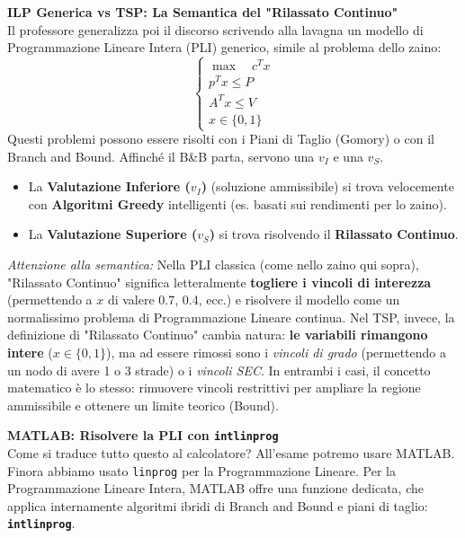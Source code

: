 \documentclass[12pt, a4paper]{article}
\newcommand{\separatore}{\noindent{\color{titlecolor!50}\rule{\textwidth}{0.6pt}}}
\begin{document}
	\textbf{ILP Generica vs TSP: La Semantica del "Rilassato Continuo"}\\
	Il professore generalizza poi il discorso scrivendo alla lavagna un modello di Programmazione Lineare Intera (PLI) generico, simile al problema dello zaino:
	\[
	\begin{cases}
		\max \quad c^T x \\[6pt]
		p^T x \leq P \\
		A^T x \leq V \\
		x \in \{0, 1\}
	\end{cases}
	\]
	Questi problemi possono essere risolti con i Piani di Taglio (Gomory) o con il Branch and Bound. Affinché il B\&B parta, servono una $v_I$ e una $v_S$.
	\begin{itemize}[label=\textcolor{titlecolor}{\Large\textbullet}, itemsep=2pt, leftmargin=1.5cm]
		\item La \textbf{Valutazione Inferiore ($v_I$)} (soluzione ammissibile) si trova velocemente con \textbf{Algoritmi Greedy} intelligenti (es. basati sui rendimenti per lo zaino).
		\item La \textbf{Valutazione Superiore ($v_S$)} si trova risolvendo il \textbf{Rilassato Continuo}.
	\end{itemize}
	\textit{Attenzione alla semantica:}
	Nella PLI classica (come nello zaino qui sopra), "Rilassato Continuo" significa letteralmente \textbf{togliere i vincoli di interezza} (permettendo a $x$ di valere 0.7, 0.4, ecc.) e risolvere il modello come un normalissimo problema di Programmazione Lineare continua.
	Nel TSP, invece, la definizione di "Rilassato Continuo" cambia natura: \textbf{le variabili rimangono intere} ($x \in \{0,1\}$), ma ad essere rimossi sono i \textit{vincoli di grado} (permettendo a un nodo di avere 1 o 3 strade) o i \textit{vincoli SEC}. In entrambi i casi, il concetto matematico è lo stesso: rimuovere vincoli restrittivi per ampliare la regione ammissibile e ottenere un limite teorico (Bound).
	
	\vspace{0.6cm}
	\separatore
	\vspace{0.4cm}
	
	\textbf{MATLAB: Risolvere la PLI con \texttt{intlinprog}}\\
	Come si traduce tutto questo al calcolatore? All'esame potremo usare MATLAB.
	Finora abbiamo usato \texttt{linprog} per la Programmazione Lineare. Per la Programmazione Lineare Intera, MATLAB offre una funzione dedicata, che applica internamente algoritmi ibridi di Branch and Bound e piani di taglio: \textbf{\texttt{intlinprog}}.
	
\end{document}
